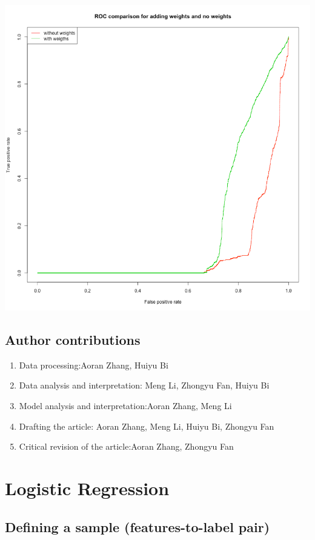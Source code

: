 \documentclass{article}
\begin{document}
\begin{spacing}{1}
\begin{large}
\includegraphics[scale = 0.5]{ROCwithandwithoutweights.png}

\subsection{Author contributions}
\begin{enumerate}
	\item
	Data processing:Aoran Zhang, Huiyu Bi
	\item
	Data analysis and interpretation: Meng Li, Zhongyu Fan, Huiyu Bi
	\item
	Model analysis and interpretation:Aoran Zhang, Meng Li
	\item
	Drafting the article: Aoran Zhang, Meng Li, Huiyu Bi, Zhongyu Fan
	\item
	Critical revision of the article:Aoran Zhang, Zhongyu Fan

\end{enumerate}

\section{Logistic Regression}

\subsection{Defining a sample (features-to-label pair)}


\end{large}
\end{spacing}
\end{document}
